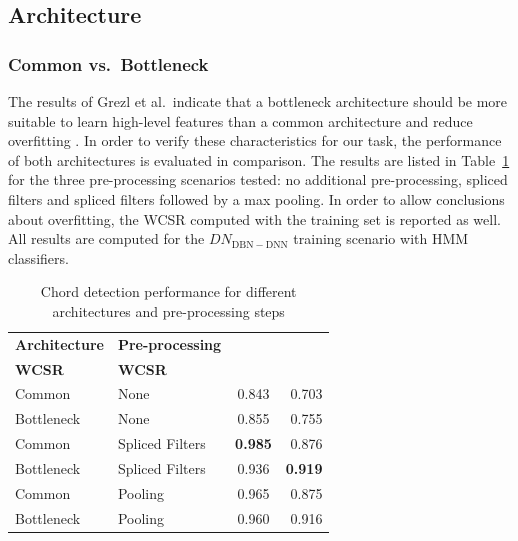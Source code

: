 \documentclass{article}
\begin{document}
\subsection{Architecture}
\subsubsection{Common vs.\ Bottleneck}
The results of Grezl et al.\ indicate that a bottleneck architecture should be more suitable to learn high-level features than a common architecture and reduce overfitting \cite{grezl2007probabilistic}. In order to verify these characteristics for our task, the performance of both architectures is evaluated in comparison. The results are listed in Table~\ref{tab:arch} for the three pre-processing scenarios tested: no additional pre-processing, spliced filters and spliced filters followed by a max pooling. In order to allow conclusions about overfitting, the WCSR computed with the training set is reported as well.
All results are computed for the $DN_\mathrm{DBN-DNN}$ training scenario with HMM classifiers.

\begin{table}
\centering
\begin{tabular*}{\columnwidth}{@{\extracolsep{\fill}}llcr}
\toprule
\textbf{Architecture}                   & \textbf{Pre-processing}                      & \begin{tabular}[c]{@{}c@{}}\textbf{Training}\\ \textbf{WCSR}\end{tabular} & \textbf{WCSR}  \\ \midrule
Common                         & None                                & 0.843                                                      & 0.703 \\
Bottleneck                     & None                                & 0.855                                                      & 0.755 \\
Common     & Spliced Filters & \textbf{0.985} & 0.876 \\
Bottleneck & Spliced Filters & 0.936 & \textbf{0.919} \\ 
Common & Pooling & 0.965 & 0.875 \\ 
Bottleneck & Pooling & 0.960 & 0.916 \\ \bottomrule
\end{tabular*}
\caption{Chord detection performance for different architectures and pre-processing steps}
\label{tab:arch}
\end{table}
\end{document}
